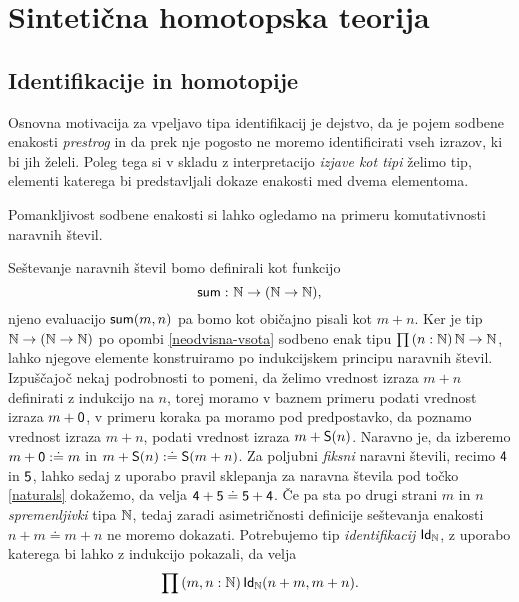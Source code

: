 \section{Sintetična homotopska teorija}


\subsection{Identifikacije in homotopije}
Osnovna motivacija za vpeljavo tipa identifikacij je dejstvo, da je pojem sodbene enakosti
\emph{prestrog} in da prek nje pogosto ne moremo identificirati vseh izrazov, ki bi
jih želeli. Poleg tega si v skladu z interpretacijo \emph{izjave kot tipi} želimo tip, elementi
katerega bi predstavljali dokaze enakosti med dvema elementoma.

Pomankljivost sodbene enakosti si lahko ogledamo na primeru
komutativnosti naravnih števil.

\begin{primer}
  Seštevanje naravnih števil bomo definirali kot funkcijo
  \[\textnormal{\textsf{sum}} \,\colon \mathbb N \to (\mathbb N \to \mathbb N),\] njeno evaluacijo \(\textnormal{\textsf{sum}}(m, n)\)
  pa bomo kot običajno pisali kot \(m + n\).
  Ker je tip \(\mathbb N \to (\mathbb N \to \mathbb N)\) po opombi \ref{neodvisna-vsota} sodbeno enak tipu
  \(\prod \left( n : \mathbb N \right) \mathbb N \to \mathbb N\), lahko njegove elemente konstruiramo po indukcijskem
  principu naravnih števil.
  Izpuščajoč nekaj podrobnosti to pomeni, da želimo vrednost izraza \(m + n\) definirati z
  indukcijo na \(n\), torej moramo v baznem primeru podati vrednost izraza \(m + \textnormal{\textsf{0}}\),
  v primeru koraka pa moramo pod predpostavko, da poznamo vrednost izraza \(m + n\),
  podati vrednost izraza \(m + \textnormal{\textsf{S}}(n)\). Naravno je,
  da izberemo \(m + \textnormal{\textsf{0}} :\doteq m\) in \(m + \textnormal{\textsf{S}}(n) :\doteq\textnormal{\textsf{S}}(m + n)\).
  Za poljubni \emph{fiksni} naravni števili, recimo
  \(\textnormal{\textsf{4}}\) in \(\textnormal{\textsf{5}}\), lahko sedaj z uporabo pravil sklepanja za naravna
  števila pod točko \ref{naturals} dokažemo, da velja
  \(\textnormal{\textsf{4}} + \textnormal{\textsf{5}} \doteq \textnormal{\textsf{5}} + \textnormal{\textsf{4}}\). Če pa sta po drugi strani
  \(m\) in \(n\)
  \emph{spremenljivki} tipa \(\mathbb N\), tedaj zaradi asimetričnosti definicije seštevanja
  enakosti \(n + m \doteq m + n\) ne moremo
  dokazati. Potrebujemo tip \emph{identifikacij} \(\textnormal{\textsf{Id}}_{\mathbb N}\), z uporabo katerega bi
  lahko z indukcijo pokazali, da velja \[\prod \left( m, n : \mathbb N \right) \textnormal{\textsf{Id}}_{\mathbb N}(n + m, m + n).\]
\end{primer}

